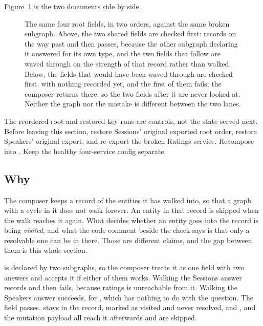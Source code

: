 %
Figure~\ref{fig:ch15-the-order-decides} is the two documents side by side.

\begin{figure}[htbp]
  \centering
  
  \caption{The same four root fields, in two orders, against the same broken
  subgraph. Above, the two shared fields are checked first:  records
   on the way past and then passes, because the other subgraph
  declaring it answered for its own type, and the two fields that follow are
  waved through on the strength of that record rather than walked. Below, the
  fields that would have been waved through are checked first, with nothing
  recorded yet, and the first of them fails; the composer returns there, so the
  two fields after it are never looked at. Neither the graph nor the mistake is
  different between the two lanes.}
  \label{fig:ch15-the-order-decides}
\end{figure}

The reordered-root and restored-key runs are controls, not the state served
next. Before leaving this section, restore Sessions' original exported
root order, restore Speakers' original export, and re-export the broken
Ratings service. Recompose
 into . Keep the
healthy four-service config separate.

\subsection{Why}

%
The composer keeps a record of the entities it has walked into, so that a graph
with a cycle in it does not walk forever. An entity in that record is skipped
when the walk reaches it again. What decides whether an entity goes into the
record is being \emph{visited}, and what the code comment beside the check says
is that only a resolvable one can be in there. Those are different claims, and
the gap between them is this whole section.

%
 is declared by two subgraphs, so the composer treats it as
one field with two answers and accepts it if either of them works. Walking the
Sessions answer records  and then fails, because ratings is
unreachable from it. Walking the Speakers answer succeeds, for ,
which has nothing to do with the question. The field passes. 
stays in the record, marked as visited and never resolved, and ,
 and the mutation payload all reach it afterwards and are
skipped.

